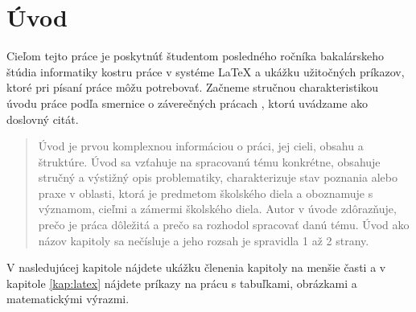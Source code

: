 \chapter*{Úvod} %

Cieľom tejto práce je poskytnúť študentom posledného ročníka
bakalárskeho štúdia informatiky kostru práce v systéme LaTeX a ukážku
užitočných príkazov, ktoré pri písaní práce môžu potrebovať. Začneme
stručnou charakteristikou úvodu práce podľa smernice o záverečných
prácach \cite{smernica}, ktorú uvádzame ako doslovný citát.

\begin{quote}
Úvod je prvou komplexnou informáciou o práci, jej cieli, obsahu a štruktúre. Úvod sa 
vzťahuje na spracovanú tému konkrétne, obsahuje stručný a výstižný opis 
problematiky, charakterizuje stav poznania alebo praxe v oblasti, ktorá je predmetom 
školského diela a oboznamuje s významom, cieľmi a zámermi školského diela. Autor 
v úvode zdôrazňuje, prečo je práca dôležitá a prečo sa rozhodol spracovať danú tému. 
Úvod ako názov kapitoly sa nečísluje a jeho rozsah je spravidla 1 až 2 strany.
\end{quote}

V nasledujúcej kapitole nájdete ukážku členenia kapitoly na menšie
časti a v kapitole \ref{kap:latex} nájdete príkazy na prácu s
tabuľkami, obrázkami a matematickými výrazmi.

